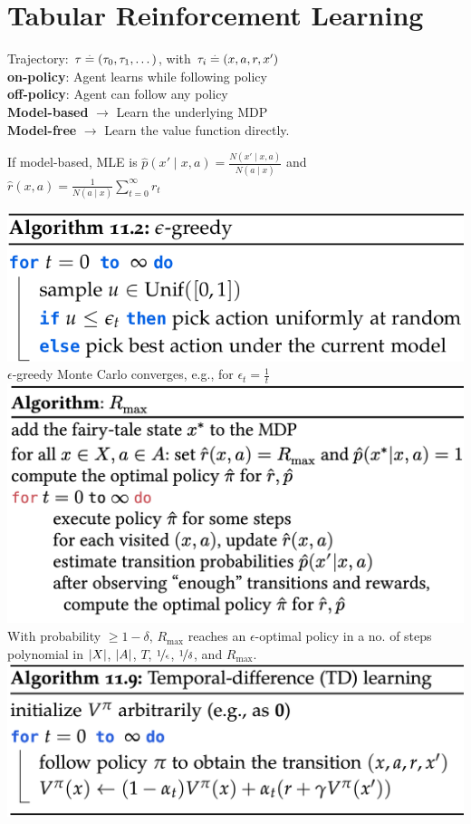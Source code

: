 \section{Tabular Reinforcement Learning}

Trajectory: $\tau \overset{.}{=} (\tau_0, \tau_1, \dots)$, with $\tau_i \overset{.}{=} (x, a, r, x')$ \\
\textbf{on-policy}: Agent learns while following policy \\
\textbf{off-policy}: Agent can follow any policy \\
\textbf{Model-based} $\rightarrow$ Learn the underlying MDP \\
\textbf{Model-free} $\rightarrow$ Learn the value function directly.
\begin{framed}
    If model-based, MLE is ${\hat{p}(x' \mid x, a) = \frac{N(x' \mid x, a)}{N(a \mid x)}}$ and ${\hat{r}(x, a) = \frac{1}{N(a \mid x)} \sum_{t = 0}^\infty r_t}$
\end{framed}
\includegraphics[width=0.9\linewidth]{images/epsilon_greedy.png}
$\epsilon$-greedy Monte Carlo converges, e.g., for $\epsilon_t = \frac{1}{t}$
\includegraphics[width=0.95\linewidth]{images/R_max.png}
With probability $\geq 1-\delta$, $R_\mathrm{max}$ reaches an $\epsilon$-optimal policy in a no. of steps polynomial in $\left| X \right|$, $\left| A \right|$, $T$, $\nicefrac{1}{\epsilon}$, $\nicefrac{1}{\delta}$, and $R_\mathrm{max}$.
\includegraphics[width=0.95\linewidth]{images/TD_learning.png}
